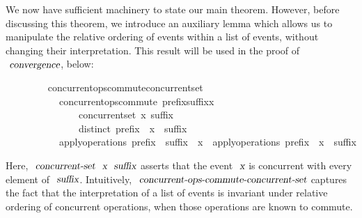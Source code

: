 \documentclass[acmlarge,review,anonymous]{acmart}\settopmatter{printfolios=true}
\begin{document}
\vspace{\baselineskip}
We now have sufficient machinery to state our main theorem.
However, before discussing this theorem, we introduce an auxiliary lemma which allows us to manipulate the relative ordering of events within a list of events, without changing their interpretation.
This result will be used in the proof of $\isa{convergence}$, below:
\\
\begin{isabellebody}
\ \ \ \ \ \ \ \  concurrent{\isacharunderscore}ops{\isacharunderscore}commute{\isacharunderscore}concurrent{\isacharunderscore}set{\isacharcolon}\isanewline
\ \ \ \ \ \ \ \ \ \ \ {\isachardoublequoteopen}concurrent{\isacharunderscore}ops{\isacharunderscore}commute\ {\isacharparenleft}prefix{\isacharat}suffix{\isacharat}{\isacharbrackleft}x{\isacharbrackright}{\isacharparenright}{\isachardoublequoteclose}\isanewline
\ \ \ \ \ \ \ \ \ \ \ \ \ \ \ {\isachardoublequoteopen}concurrent{\isacharunderscore}set\ x\ suffix{\isachardoublequoteclose}\isanewline
\ \ \ \ \ \ \ \ \ \ \ \ \ \ \ {\isachardoublequoteopen}distinct\ {\isacharparenleft}prefix\ {\isacharat}\ x\ {\isacharhash}\ suffix{\isacharparenright}{\isachardoublequoteclose}\isanewline
\ \ \ \ \ \ \ \ \ \ \ {\isachardoublequoteopen}apply{\isacharunderscore}operations\ {\isacharparenleft}prefix\ {\isacharat}\ suffix\ {\isacharat}\ {\isacharbrackleft}x{\isacharbrackright}{\isacharparenright}\ {\isacharequal}\ apply{\isacharunderscore}operations\ {\isacharparenleft}prefix\ {\isacharat}\ x\ {\isacharhash}\ suffix{\isacharparenright}{\isachardoublequoteclose}
\end{isabellebody}
\vspace{\baselineskip}
Here, $\isa{concurrent-set}\ \isa{x}\ \isa{suffix}$ asserts that the event $\isa{x}$ is concurrent with every element of $\isa{suffix}$.
Intuitively, $\isa{concurrent-ops-commute-concurrent-set}$ captures the fact that the interpretation of a list of events is invariant under relative ordering of concurrent operations, when those operations are known to commute.
\end{document}
